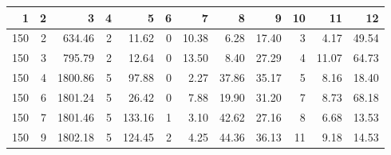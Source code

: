 \begin{tabular}{rrrrrrrrrrrr}
\toprule
1 & 2 & 3 & 4 & 5 & 6 & 7 & 8 & 9 & 10 & 11 & 12 \\
\midrule
150 & 2 & 634.46 & 2 & 11.62 & 0 & 10.38 & 6.28 & 17.40 & 3 & 4.17 & 49.54 \\
150 & 3 & 795.79 & 2 & 12.64 & 0 & 13.50 & 8.40 & 27.29 & 4 & 11.07 & 64.73 \\
150 & 4 & 1800.86 & 5 & 97.88 & 0 & 2.27 & 37.86 & 35.17 & 5 & 8.16 & 18.40 \\
150 & 6 & 1801.24 & 5 & 26.42 & 0 & 7.88 & 19.90 & 31.20 & 7 & 8.73 & 68.18 \\
150 & 7 & 1801.46 & 5 & 133.16 & 1 & 3.10 & 42.62 & 27.16 & 8 & 6.68 & 13.53 \\
150 & 9 & 1802.18 & 5 & 124.45 & 2 & 4.25 & 44.36 & 36.13 & 11 & 9.18 & 14.53 \\
\bottomrule
\end{tabular}
